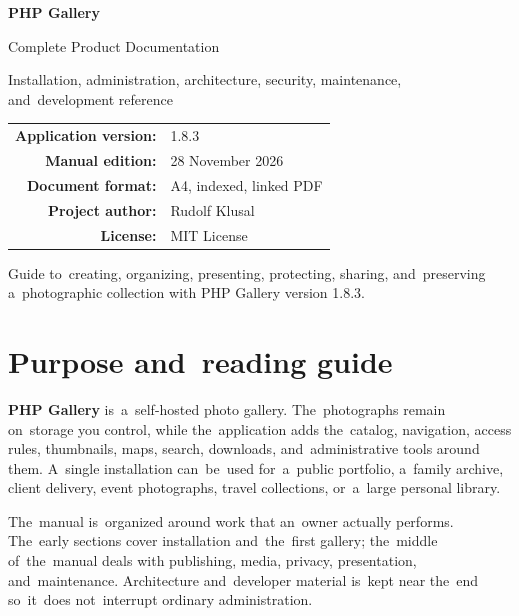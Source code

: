 \documentclass[11pt,a4paper]{article}
\newcommand{\version}{1.8.3}
\newcommand{\manualdate}{28 November 2026}
\newcommand{\product}{\textbf{PHP Gallery}}
\begin{document}
\begin{titlepage}
  \centering
  \vspace*{24mm}
  {\Huge\bfseries\color{GalleryBlue} PHP Gallery\par}
  \vspace{6mm}
  {\LARGE Complete Product Documentation\par}
  \vspace{14mm}
  {\large Installation, administration, architecture, security, maintenance,
  and~development reference\par}
  \vfill
  \begin{tabular}{rl}
    \textbf{Application version:} & \version\\
    \textbf{Manual edition:} & \manualdate\\
    \textbf{Document format:} & A4, indexed, linked PDF\\
    \textbf{Project author:} & Rudolf Klusal\\
    \textbf{License:} & MIT License\\
  \end{tabular}
  \vfill
  {\small Guide to~creating, organizing, presenting, protecting, sharing,
  and~preserving a~photographic collection with PHP Gallery version
  \version.\par}
\end{titlepage}

\begingroup
\small
\setlength{\parskip}{0pt}
\tableofcontents
\endgroup
\clearpage
{}

\section{Purpose and~reading guide}

\product{} is~a~self-hosted photo gallery. The~photographs remain on~storage you
control, while the~application adds the~catalog, navigation, access rules,
thumbnails, maps, search, downloads, and~administrative tools around them.
A~single installation can~be~used for~a~public portfolio, a~family archive,
client delivery, event photographs, travel collections, or~a~large personal
library.

The~manual is~organized around work that an~owner actually performs. The~early
sections cover installation and~the~first gallery; the~middle of~the~manual
deals with publishing, media, privacy, presentation, and~maintenance.
Architecture and~developer material is~kept near the~end so~it~does
not~interrupt ordinary administration.
\end{document}
